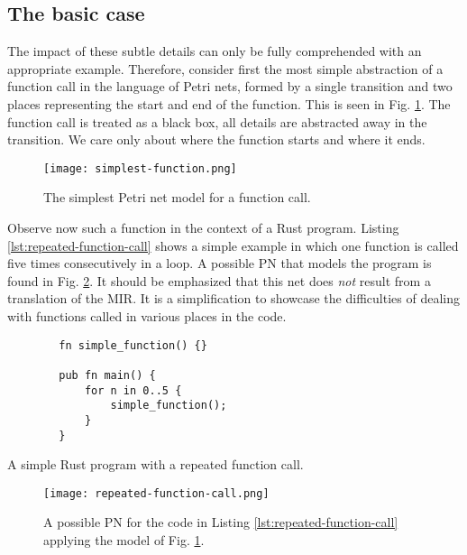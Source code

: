 \documentclass[../Thesis.tex]{subfiles}
\begin{document}
\subsection{The basic case}

The impact of these subtle details can only
be fully comprehended with an appropriate example.
Therefore, consider first the most simple abstraction of a function call in
the language of Petri nets, formed by a single transition and
two places representing the start and end of the function.
This is seen in Fig. \ref{fig:simplest-function}.
The function call is treated as a black box,
all details are abstracted away in the transition.
We care only about where the function starts and where it ends.

\begin{figure}[!htb]
    \centering
    \texttt{[image: simplest-function.png]}
    \caption{The simplest Petri net model for a function call.}
    \label{fig:simplest-function}
\end{figure}

Observe now such a function in the context of a Rust program.
Listing \ref{lst:repeated-function-call} shows a simple example
in which one function is called
five times consecutively in a  loop.
A possible \acrshort{PN} that models the program
is found in Fig. \ref{fig:repeated-function-call}.
It should be emphasized that
this net does \emph{not} result from a translation of the MIR.
It is a simplification to showcase the difficulties
of dealing with functions called in various places in the code.

\begin{listing}
    \begin{verbatim}
        fn simple_function() {}

        pub fn main() {
            for n in 0..5 {
                simple_function();
            }
        }
    \end{verbatim}
    \caption{A simple Rust program with a repeated function call.}
    \label{lst:repeated-function-call}
\end{listing}

\begin{figure}[!htb]
    \centering
    \texttt{[image: repeated-function-call.png]}
    \caption{A possible \acrshort{PN} for the code in Listing \ref{lst:repeated-function-call}
        applying the model of Fig. \ref{fig:simplest-function}.}
    \label{fig:repeated-function-call}
\end{figure}
\end{document}
